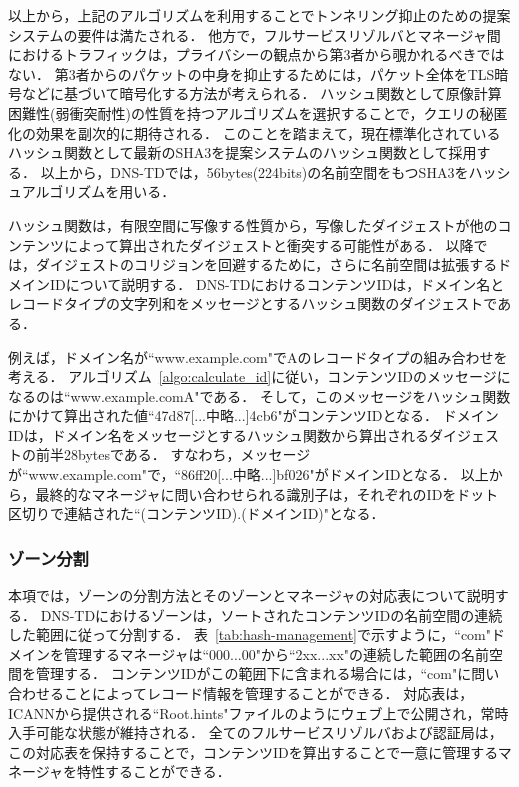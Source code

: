 以上から，上記のアルゴリズムを利用することでトンネリング抑止のための提案システムの要件は満たされる．
他方で，フルサービスリゾルバとマネージャ間におけるトラフィックは，プライバシーの観点から第3者から覗かれるべきではない．
第3者からのパケットの中身を抑止するためには，パケット全体をTLS暗号などに基づいて暗号化する方法が考えられる．
ハッシュ関数として原像計算困難性(弱衝突耐性)の性質を持つアルゴリズムを選択することで，クエリの秘匿化の効果を副次的に期待される．
このことを踏まえて，現在標準化されているハッシュ関数として最新のSHA3を提案システムのハッシュ関数として採用する．
以上から，DNS-TDでは，56bytes(224bits)の名前空間をもつSHA3をハッシュアルゴリズムを用いる．

ハッシュ関数は，有限空間に写像する性質から，写像したダイジェストが他のコンテンツによって算出されたダイジェストと衝突する可能性がある．
以降では，ダイジェストのコリジョンを回避するために，さらに名前空間は拡張するドメインIDについて説明する．
DNS-TDにおけるコンテンツIDは，ドメイン名とレコードタイプの文字列和をメッセージとするハッシュ関数のダイジェストである．



例えば，ドメイン名が``www.example.com"でAのレコードタイプの組み合わせを考える．
アルゴリズム~\ref{algo:calculate_id}に従い，コンテンツIDのメッセージになるのは``www.example.comA"である．
そして，このメッセージをハッシュ関数にかけて算出された値``47d87[...中略...]4cb6"がコンテンツIDとなる．
ドメインIDは，ドメイン名をメッセージとするハッシュ関数から算出されるダイジェストの前半28bytesである．
すなわち，メッセージが``www.example.com"で，``86ff20[...中略...]bf026"がドメインIDとなる．
以上から，最終的なマネージャに問い合わせられる識別子は，それぞれのIDをドット区切りで連結された``(コンテンツID).(ドメインID)"となる．

\subsubsection{ゾーン分割}
本項では，ゾーンの分割方法とそのゾーンとマネージャの対応表について説明する．
DNS-TDにおけるゾーンは，ソートされたコンテンツIDの名前空間の連続した範囲に従って分割する．
表~\ref{tab:hash-management}で示すように，``com"ドメインを管理するマネージャは``000...00"から``2xx...xx"の連続した範囲の名前空間を管理する．
コンテンツIDがこの範囲下に含まれる場合には，``com"に問い合わせることによってレコード情報を管理することができる．
対応表は，ICANNから提供される``Root.hints"ファイルのようにウェブ上で公開され，常時入手可能な状態が維持される．
全てのフルサービスリゾルバおよび認証局は，この対応表を保持することで，コンテンツIDを算出することで一意に管理するマネージャを特性することができる．


